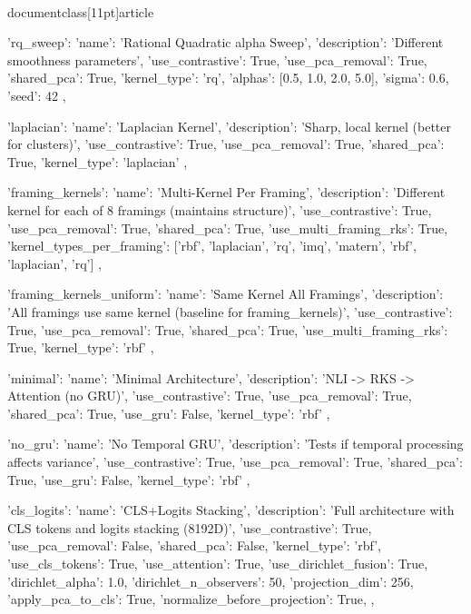 \\documentclass[11pt]{article}
\begin{document}
\begin{CodeBlock}
{    'rq_sweep': {
        'name': 'Rational Quadratic alpha Sweep',
        'description': 'Different smoothness parameters',
        'use_contrastive': True,
        'use_pca_removal': True,
        'shared_pca': True,
        'kernel_type': 'rq',
        'alphas': [0.5, 1.0, 2.0, 5.0],
        'sigma': 0.6,
        'seed': 42
    },
    
    'laplacian': {
        'name': 'Laplacian Kernel',
        'description': 'Sharp, local kernel (better for clusters)',
        'use_contrastive': True,
        'use_pca_removal': True,
        'shared_pca': True,
        'kernel_type': 'laplacian'
    },
    
    'framing_kernels': {
        'name': 'Multi-Kernel Per Framing',
        'description': 'Different kernel for each of 8 framings (maintains structure)',
        'use_contrastive': True,
        'use_pca_removal': True,
        'shared_pca': True,
        'use_multi_framing_rks': True,
        'kernel_types_per_framing': ['rbf', 'laplacian', 'rq', 'imq', 'matern', 'rbf', 'laplacian', 'rq']
    },
    
    'framing_kernels_uniform': {
        'name': 'Same Kernel All Framings',
        'description': 'All framings use same kernel (baseline for framing_kernels)',
        'use_contrastive': True,
        'use_pca_removal': True,
        'shared_pca': True,
        'use_multi_framing_rks': True,
        'kernel_type': 'rbf'
    },
    
    'minimal': {
        'name': 'Minimal Architecture',
        'description': 'NLI -> RKS -> Attention (no GRU)',
        'use_contrastive': True,
        'use_pca_removal': True,
        'shared_pca': True,
        'use_gru': False,
        'kernel_type': 'rbf'
    },
    
    'no_gru': {
        'name': 'No Temporal GRU',
        'description': 'Tests if temporal processing affects variance',
        'use_contrastive': True,
        'use_pca_removal': True,
        'shared_pca': True,
        'use_gru': False,
        'kernel_type': 'rbf'
    },
    
    'cls_logits': {
        'name': 'CLS+Logits Stacking',
        'description': 'Full architecture with CLS tokens and logits stacking (8192D)',
        'use_contrastive': True,
        'use_pca_removal': False,
        'shared_pca': False,
        'kernel_type': 'rbf',
        'use_cls_tokens': True,
        'use_attention': True,
        'use_dirichlet_fusion': True,
        'dirichlet_alpha': 1.0,
        'dirichlet_n_observers': 50,
        'projection_dim': 256,
        'apply_pca_to_cls': True,
        'normalize_before_projection': True,
    },
    
}
\end{CodeBlock}
\end{document}
